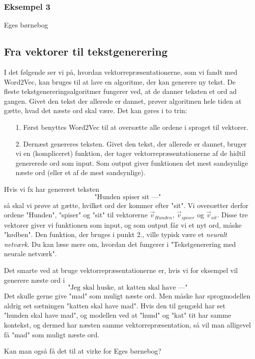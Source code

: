 \documentclass{article}
\newcommand{\am}[1]{{\color{red} #1}}
\begin{document}
\subsubsection*{Eksempel 3}
\am{Eges børnebog}

\subsection*{Fra vektorer til tekstgenerering}
I det følgende ser vi på, hvordan vektorrepræsentationerne, som vi fandt med Word2Vec, kan bruges til at lave en algoritme, der kan generere ny tekst. De fleste tekstgenereringsalgoritmer fungerer ved, at de danner teksten et ord ad gangen. Givet den tekst der allerede er dannet, prøver algoritmen hele tiden at gætte, hvad det næste ord skal være. Det kan gøres i to trin:
\begin{itemize}
\item[1.] Først benyttes Word2Vec til at oversætte alle ordene i sproget til vektorer.
\item[2.] Dernæst genereres teksten. Givet den tekst, der allerede er dannet, bruger vi en (kompliceret) funktion, der tager vektorrepræsentationerne af de hidtil genererede ord som input. Som output giver funktionen det mest sandsynlige næste ord (eller et af de mest sandsynlige).
\end{itemize}
Hvis vi fx har genereret teksten
$$\text{"Hunden spiser sit ---"} $$
så skal vi prøve at gætte, hvilket ord der kommer efter "sit". Vi oversætter derfor ordene "Hunden", "spiser" og "sit" til vektorerne $\overrightarrow{v}_{Hunden}$, $\overrightarrow{v}_{spiser}$ og $\overrightarrow{v}_{sit}$. Disse tre vektorer giver vi funktionen som input, og som output får vi et nyt ord, måske "kødben".
Den funktion, der bruges i punkt 2., ville typisk være  et \emph{neuralt netværk}.
Du kan læse mere om, hvordan det fungerer i \am{"Tekstgenerering med neurale netværk"}. 

Det smarte ved at bruge vektorrepræsentationerne er, hvis vi for eksempel vil generere næste ord i 
$$\text{"Jeg skal huske, at katten skal have ---"}$$
Det skulle gerne give "mad" som muligt næste ord. Men måske har sprogmodellen aldrig set sætningen "katten skal have mad". Hvis den til gengæld har set  "hunden skal have mad", og modellen ved at "hund" og "kat" tit har samme kontekst, og dermed har næsten samme vektorrepræsentation, så vil  man alligevel få "mad" som muligt næste ord. 


\am{Kan man også få det til at virke for Eges børnebog?}
\end{document}
